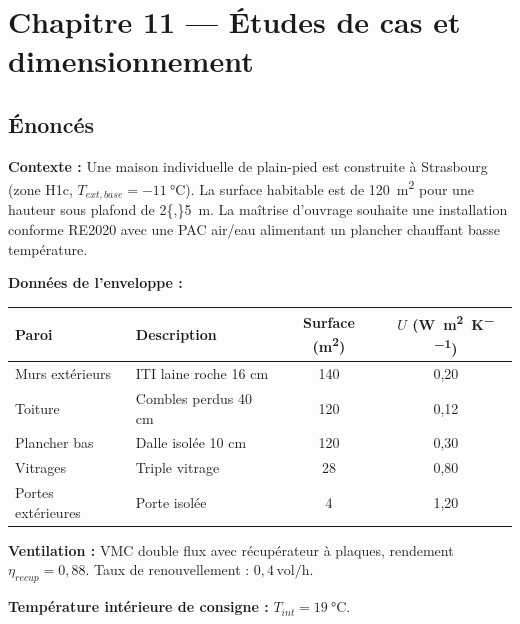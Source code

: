 \chapter*{Chapitre 11 — Études de cas et dimensionnement}

\section*{Énoncés}


\textbf{Contexte :}
Une maison individuelle de plain-pied est construite à Strasbourg (zone H1c,
$T_{ext,base} = \SI{-11}{\celsius}$). La surface habitable est de \SI{120}{\metre\squared}
pour une hauteur sous plafond de \SI{2{,}5}{\metre}. La maîtrise d'ouvrage souhaite
une installation conforme RE2020 avec une PAC air/eau alimentant un plancher chauffant basse température.

\textbf{Données de l'enveloppe :}

\begin{center}
\begin{tabular}{llcc}
  \toprule
  Paroi & Description & Surface (\si{\metre\squared}) & $U$ (\si{\watt\per\metre\squared\per\kelvin}) \\
  \midrule
  Murs extérieurs    & ITI laine roche 16 cm   & 140 & 0,20 \\
  Toiture            & Combles perdus 40 cm    & 120 & 0,12 \\
  Plancher bas       & Dalle isolée 10 cm      & 120 & 0,30 \\
  Vitrages           & Triple vitrage          &  28 & 0,80 \\
  Portes extérieures & Porte isolée            &   4 & 1,20 \\
  \bottomrule
\end{tabular}
\end{center}

\textbf{Ventilation :} VMC double flux avec récupérateur à plaques, rendement $\eta_{recup} = 0{,}88$.
Taux de renouvellement : $0{,}4\,\mathrm{vol/h}$.

\textbf{Température intérieure de consigne :} $T_{int} = \SI{19}{\celsius}$.

